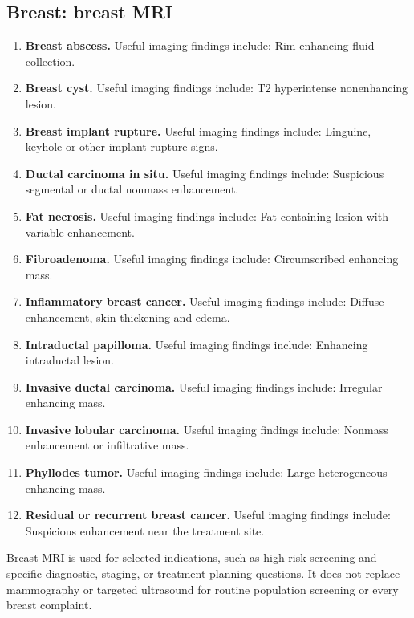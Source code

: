\subsection{Breast: breast MRI}
\begin{enumerate}[leftmargin=*,itemsep=0.45em,topsep=0.4em]
\item \textbf{Breast abscess.} Useful imaging findings include: Rim-enhancing fluid collection.
\item \textbf{Breast cyst.} Useful imaging findings include: T2 hyperintense nonenhancing lesion.
\item \textbf{Breast implant rupture.} Useful imaging findings include: Linguine, keyhole or other implant rupture signs.
\item \textbf{Ductal carcinoma in situ.} Useful imaging findings include: Suspicious segmental or ductal nonmass enhancement.
\item \textbf{Fat necrosis.} Useful imaging findings include: Fat-containing lesion with variable enhancement.
\item \textbf{Fibroadenoma.} Useful imaging findings include: Circumscribed enhancing mass.
\item \textbf{Inflammatory breast cancer.} Useful imaging findings include: Diffuse enhancement, skin thickening and edema.
\item \textbf{Intraductal papilloma.} Useful imaging findings include: Enhancing intraductal lesion.
\item \textbf{Invasive ductal carcinoma.} Useful imaging findings include: Irregular enhancing mass.
\item \textbf{Invasive lobular carcinoma.} Useful imaging findings include: Nonmass enhancement or infiltrative mass.
\item \textbf{Phyllodes tumor.} Useful imaging findings include: Large heterogeneous enhancing mass.
\item \textbf{Residual or recurrent breast cancer.} Useful imaging findings include: Suspicious enhancement near the treatment site.
\end{enumerate}

Breast MRI is used for selected indications, such as high-risk screening and specific diagnostic, staging, or treatment-planning questions. It does not replace mammography or targeted ultrasound for routine population screening or every breast complaint.

